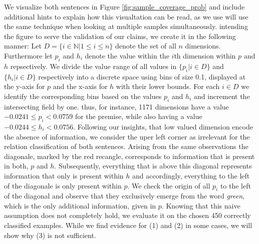 We visualize both sentences in Figure \ref{fig:sample_coverage_prob} and include additional hints to explain how this visualtation can be read, as we use will use the same technique when looking at multiple samples simultaneously. intending the figure to serve the validation of our claims, we create it in the following manner: Let $D = \{i \in \mathbb{N} | 1 \leq i \leq n\}$ denote the set of all $n$ dimensions. Furthermore let $p_i$ and $h_i$ denote the value within the $i$th dimension within $p$ and $h$ repsectively. We divide the value range of all values in $\{p_i | i \in D\}$ and $\{h_i | i \in D\}$ respectively into a discrete space using bins of size 0.1, displayed at the y-axis for $p$ and the x-axis for $h$ with their lower bounds. For each $i \in D$ we identify the corresponding bins based on the values $p_i$ and $h_i$ and increment the intersecting field by one. thus, for instance, 1171 dimensions have a value $-0.0241 \leq p_i < 0.0759$ for the premise, while also having a value $-0.0244 \leq h_i < 0.0756$. Following our insights, that low valued dimension encode the absence of information, we consider the uper left corner as irrelevant for the relation classification of both sentences. Arising from the same observations the diagonale, marked by the red recangle, corresponds to information that is present in both, $p$ and $h$. Subsequently, everything that is above this diagonal represents information that only is present within $h$ and accordingly, everything to the left of the diagonale is only present within $p$. We check the origin of all $p_i$ to the left of the diagonal and observe that they exclusively emerge from the word \textit{green}, which is the only additional information, given in $p$.
Knowing that this naive assumption does not completely hold, we evaluate it on the chosen 450 correctly classified examples. While we find evidence for (1) and (2) in some cases, we will show why (3) is not sufficient. 
